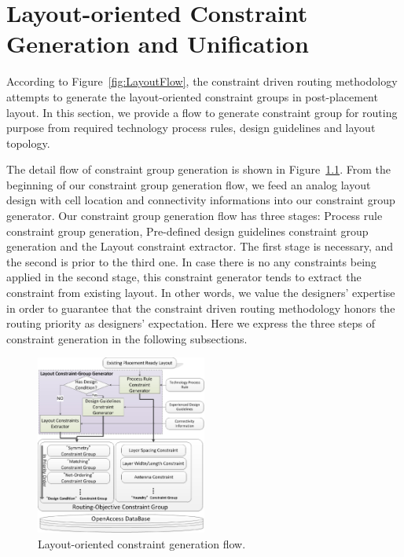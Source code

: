 \chapter{Layout-oriented Constraint Generation and Unification}\label{chap:cg}


  According to Figure~\ref{fig:LayoutFlow}, the constraint driven routing methodology attempts to generate the layout-oriented constraint groups in post-placement layout. In this section, we provide a flow to generate constraint group for routing purpose from required technology process rules, design guidelines and layout topology. 
  
  The detail flow of constraint group generation is shown in Figure~\ref{fig:LayoutCGGen}. From the beginning of our constraint group generation flow, we feed an analog layout design with cell location and connectivity informations into our constraint group generator. Our constraint group generation flow has three stages: Process rule constraint group generation, Pre-defined design guidelines constraint group generation and the Layout constraint extractor. The first stage is necessary, and the second is prior to the third one. In case there is no any constraints being applied in the second stage, this constraint generator tends to extract the constraint from existing layout. In other words, we value the designers' expertise in order to guarantee that the constraint driven routing methodology honors the routing priority as designers' expectation. Here we express the three steps of constraint generation in the following subsections. 
  
  \begin{figure}[t]
    \centering
      \includegraphics[width=0.5\textwidth]{Fig/CG/LayoutConGen.eps}
      \caption{Layout-oriented constraint generation flow.}
      \label{fig:LayoutCGGen}
  \end{figure}

